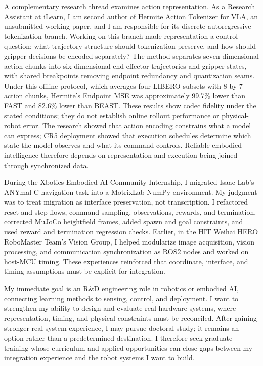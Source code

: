 A complementary research thread examines action representation. As a Research Assistant at iLearn, I am second author of Hermite Action Tokenizer for VLA, an unsubmitted working paper, and I am responsible for its discrete autoregressive tokenization branch. Working on this branch made representation a control question: what trajectory structure should tokenization preserve, and how should gripper decisions be encoded separately? The method separates seven-dimensional action chunks into six-dimensional end-effector trajectories and gripper states, with shared breakpoints removing endpoint redundancy and quantization seams. Under this offline protocol, which averages four LIBERO subsets with 8-by-7 action chunks, Hermite's Endpoint MSE was approximately 99.7\% lower than FAST and 82.6\% lower than BEAST. These results show codec fidelity under the stated conditions; they do not establish online rollout performance or physical-robot error. The research showed that action encoding constrains what a model can express; CR5 deployment showed that execution schedules determine which state the model observes and what its command controls. Reliable embodied intelligence therefore depends on representation and execution being joined through synchronized data.

During the Xbotics Embodied AI Community Internship, I migrated Isaac Lab's ANYmal-C navigation task into a MotrixLab NumPy environment. My judgment was to treat migration as interface preservation, not transcription. I refactored reset and step flows, command sampling, observations, rewards, and termination, corrected MuJoCo heightfield frames, added spawn and goal constraints, and used reward and termination regression checks. Earlier, in the HIT Weihai HERO RoboMaster Team's Vision Group, I helped modularize image acquisition, vision processing, and communication synchronization as ROS2 nodes and worked on host-MCU timing. These experiences reinforced that coordinate, interface, and timing assumptions must be explicit for integration.

My immediate goal is an R\&D engineering role in robotics or embodied AI, connecting learning methods to sensing, control, and deployment. I want to strengthen my ability to design and evaluate real-hardware systems, where representation, timing, and physical constraints must be reconciled. After gaining stronger real-system experience, I may pursue doctoral study; it remains an option rather than a predetermined destination. I therefore seek graduate training whose curriculum and applied opportunities can close gaps between my integration experience and the robot systems I want to build.
